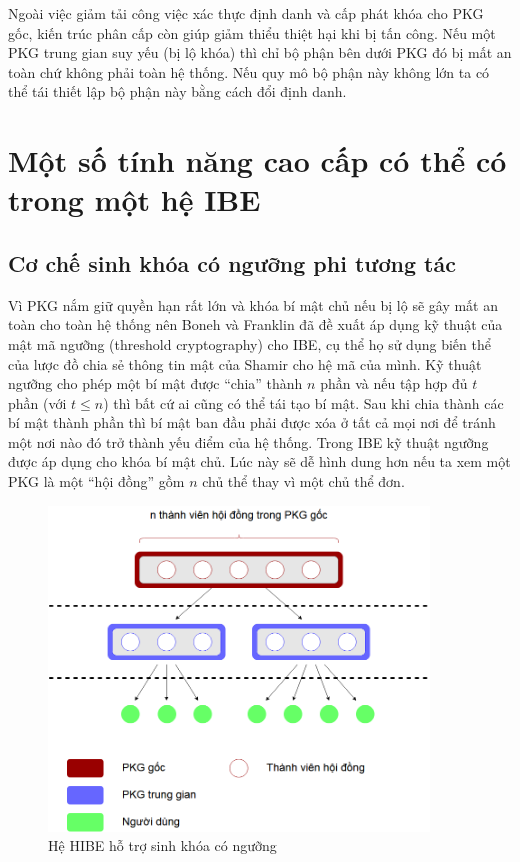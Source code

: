 \documentclass[class=report, crop=false]{standalone}
\begin{document}
		Ngoài việc giảm tải công việc xác thực định danh và cấp phát khóa cho PKG gốc, kiến trúc phân cấp còn giúp giảm thiểu thiệt hại khi bị tấn công. Nếu một PKG trung gian suy yếu (bị lộ khóa) thì chỉ bộ phận bên dưới PKG đó bị mất an toàn chứ không phải toàn hệ thống. Nếu quy mô bộ phận này không lớn ta có thể tái thiết lập bộ phận này bằng cách đổi định danh.
	\section{Một số tính năng cao cấp có thể có trong một hệ IBE}
		\subsection{Cơ chế sinh khóa có ngưỡng phi tương tác}
			Vì PKG nắm giữ quyền hạn rất lớn và khóa bí mật chủ nếu bị lộ sẽ gây mất an toàn cho toàn hệ thống nên Boneh và Franklin \cite{DBLP:conf/crypto/BonehF01} đã đề xuất áp dụng kỹ thuật của mật mã ngưỡng (threshold cryptography) cho IBE, cụ thể họ sử dụng biến thể của lược đồ chia sẻ thông tin mật của Shamir \cite{DBLP:journals/cacm/Shamir79} cho hệ mã của mình. Kỹ thuật ngưỡng cho phép một bí mật được ``chia'' thành $n$ phần và nếu tập hợp đủ $t$ phần (với $t \leq n$) thì bất cứ ai cũng có thể tái tạo bí mật. Sau khi chia thành các bí mật thành phần thì bí mật ban đầu phải được xóa ở tất cả mọi nơi để tránh một nơi nào đó trở thành yếu điểm của hệ thống. Trong IBE kỹ thuật ngưỡng được áp dụng cho khóa bí mật chủ. Lúc này sẽ dễ hình dung hơn nếu ta xem một PKG là một ``hội đồng'' gồm $n$ chủ thể thay vì một chủ thể đơn.
			\begin{figure}[h]
				\captionsetup{font=normalsize}
				\includegraphics[width=0.9\textwidth]{threshold_ibe.png}
				\centering
				\caption{Hệ HIBE hỗ trợ sinh khóa có ngưỡng}
			\end{figure}
			
\end{document}
